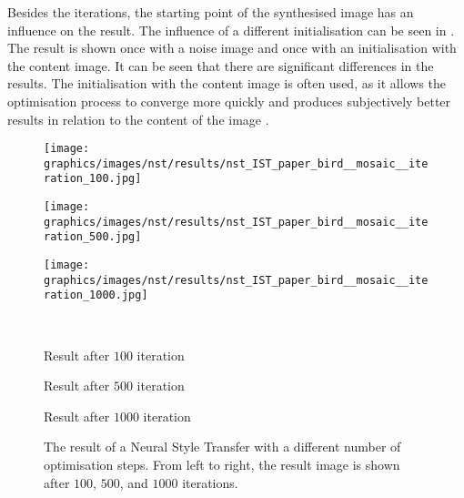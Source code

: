 Besides the iterations, the starting point of the synthesised image \image{} has an influence on the result. The influence of a different initialisation can be seen in . The result is shown once with a noise image and once with an initialisation with the content image. It can be seen that there are significant differences in the results. The initialisation with the content image is often used, as it allows the optimisation process to converge more quickly and produces subjectively better results in relation to the content of the image \cite{TODO}.
\begin{figure}[h]
	\centering
	\begin{minipage}{.33\textwidth}
		\centering
		\texttt{[image: graphics/images/nst/results/nst\_IST\_paper\_bird\_\_mosaic\_\_iteration\_100.jpg]}
	\end{minipage}%
	\begin{minipage}{.33\textwidth}
		\centering
		\texttt{[image: graphics/images/nst/results/nst\_IST\_paper\_bird\_\_mosaic\_\_iteration\_500.jpg]}
	\end{minipage}%
	\begin{minipage}{.33\textwidth}
	\centering
	\texttt{[image: graphics/images/nst/results/nst\_IST\_paper\_bird\_\_mosaic\_\_iteration\_1000.jpg]}
	\end{minipage}\\ \vspace{0.15cm}
	\begin{minipage}{.33\textwidth}
		\centering
		Result after $100$ iteration
	\end{minipage}%
	\begin{minipage}{.33\textwidth}
		\centering
		Result after $500$ iteration
	\end{minipage}%
	\begin{minipage}{.33\textwidth}
		\centering
		Result after $1000$ iteration
	\end{minipage}
	\caption{The result of a Neural Style Transfer with a different number of optimisation steps. From left to right, the result image is shown after $100$, $500$, and $1000$ iterations.}
	\label{fig:iteration_nst}
\end{figure}

